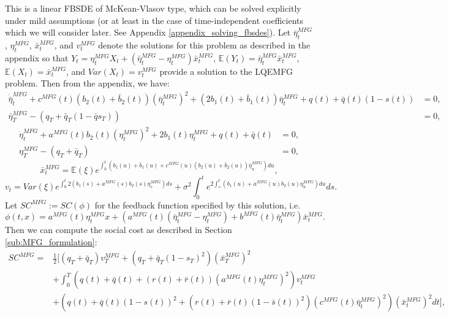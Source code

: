 \documentclass[11pt]{article}
\begin{document}
This is a linear FBSDE of McKean-Vlasov type, which can be solved explicitly under mild assumptions (or at least in the case of time-independent coefficients which we will consider later. See Appendix \ref{appendix_solving_fbsdes}). Let $\bar{\eta}_t^{MFG}$, $\eta_t^{MFG}$, $\bar{x}_t^{MFG}$, and $v^{MFG}_t$ denote the solutions for this problem as described in the appendix so that $Y_t=\eta_t^{MFG}X_t+(\bar{\eta}_t^{MFG}-\eta_t^{MFG})\bar{x}_t^{MFG}$, $\mathbb{E}(Y_t)=\bar{\eta}_t^{MFG}\bar{x}_t^{MFG}$, $\mathbb{E}(X_t)=\bar{x}_t^{MFG}$, and $Var(X_t)=v^{MFG}_t$ provide a solution to the LQEMFG problem. Then from the appendix, we have:
\begin{equation*}
\begin{split}
\dot{\bar{\eta}}^{MFG}_t+c^{MFG}(t)(b_2(t)+\bar{b}_2(t)) (\bar{\eta}^{MFG}_t)^2+(2b_1(t)+\bar{b}_1(t)) \bar{\eta}^{MFG}_t +q(t)+\bar{q}(t)(1-s(t))&=0,\\
\bar{\eta}^{MFG}_T-(q_T+\bar{q}_T(1-\bar{q}s_T))&=0,
\end{split}
\end{equation*}
\begin{equation*}
\begin{split}
\dot{\eta}^{MFG}_t+a^{MFG}(t)b_2(t)(\eta^{MFG}_t)^2+2b_1(t)\eta^{MFG}_t+q(t)+\bar{q}(t)&=0, \\
\eta^{MFG}_T-(q_T+\bar{q}_T)&=0,
\end{split}
\end{equation*}
\begin{equation*}
\bar{x}^{MFG}_t=\mathbb{E}(\xi) e^{\int_0^t(b_1(u)+\bar{b}_1(u)+c^{MFG}(u)(b_2(u)+\bar{b}_2(u))\bar{\eta}^{MFG}_u)du},
\end{equation*}
\begin{equation*}
v_t=Var(\xi)e^{\int_0^t 2(b_1(s)+a^{MFG}(s)b_2(s)\eta^{MFG}_s)ds}+\sigma^2 \int_0^t e^{2 \int_s^t (b_1(u)+a^{MFG}(u)b_2(u)\eta^{MFG}_u) du}ds.
\end{equation*}
Let $SC^{MFG}:=SC(\phi)$ for the feedback function specified by this solution, i.e.
\begin{equation*}
    \phi(t,x)=a^{MFG}(t)\eta_t^{MFG}x+\left(a^{MFG}(t)(\bar{\eta}_t^{MFG}-\eta_t^{MFG})+b^{MFG}(t)\bar{\eta}_t^{MFG} \right)\bar{x}_t^{MFG}.
\end{equation*}
Then we can compute the social cost as described in Section \ref{sub:MFG_formulation}:
\begin{equation*}
\begin{split}
    SC^{MFG}=&\frac{1}{2}[(q_T+\bar{q}_T)v_T^{MFG}+(q_T+\bar{q}_T(1-s_T)^2)(\bar{x}_T^{MFG})^2\\
    &+\int_0^T (q(t)+\bar{q}(t)+(r(t)+\bar{r}(t))(a^{MFG}(t)\eta_t^{MFG})^2)v_t^{MFG}\\
    &+(q(t)+\bar{q}(t)(1-s(t))^2+(r(t)+\bar{r}(t)(1-\bar{s}(t))^2)(c^{MFG}(t)\bar{\eta}_t^{MFG})^2)(\bar{x}_t^{MFG})^2dt],
\end{split}
\end{equation*}
\end{document}
